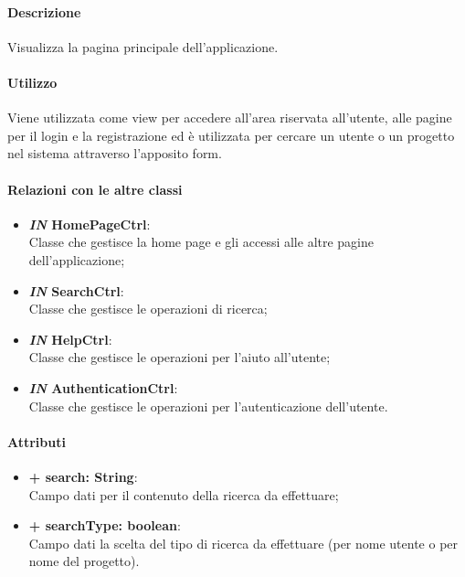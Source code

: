 	\paragraph{Descrizione}
	Visualizza la pagina principale dell'applicazione.
	
	\paragraph{Utilizzo}
	Viene utilizzata come view per accedere all'area riservata all'utente, alle pagine per il login e la registrazione ed è utilizzata per cercare un utente o un progetto nel sistema attraverso l'apposito form.
	
	\paragraph{Relazioni con le altre classi}
	\begin{itemize}
		\item \textbf{\textit{IN} HomePageCtrl}:\\
			Classe che gestisce la home page e gli accessi alle altre pagine dell'applicazione;
		\item \textbf{\textit{IN} SearchCtrl}:\\
			Classe che gestisce le operazioni di ricerca;
		\item \textbf{\textit{IN} HelpCtrl}:\\
			Classe che gestisce le operazioni per l'aiuto all'utente;
		\item \textbf{\textit{IN} AuthenticationCtrl}:\\
			Classe che gestisce le operazioni per l'autenticazione dell'utente.
	\end{itemize}
	
	\paragraph{Attributi}
	\begin{itemize}
		\item \textbf{+ search: String}:\\
			Campo dati per il contenuto della ricerca da effettuare;
		\item \textbf{+ searchType: boolean}:\\
			Campo dati la scelta del tipo di ricerca da effettuare (per nome utente o per nome del progetto).
	\end{itemize}
\newpage
	
	
